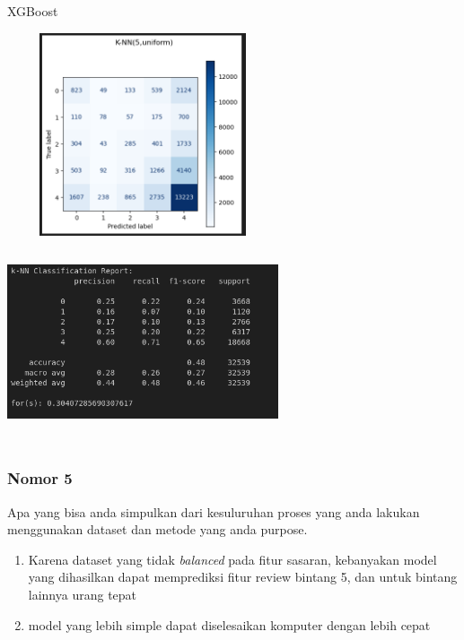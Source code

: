 \documentclass{article}
\begin{document}
 \begin{center}
    XGBoost
 \end{center}
 \begin{center}
    \includegraphics[width=8cm, height=6cm]{images/knn-confusion.png}
    \includegraphics[width=8cm, height=6cm]{images/knn-f1.png}
 \end{center}

\subsubsection*{Nomor 5}
Apa yang bisa anda simpulkan dari kesuluruhan proses yang anda lakukan menggunakan dataset dan metode yang anda purpose.
\begin{enumerate}
    \item Karena dataset yang tidak \emph{balanced} pada fitur sasaran, kebanyakan model yang dihasilkan dapat memprediksi fitur review bintang 5, dan untuk bintang lainnya urang tepat
    \item model yang lebih simple dapat diselesaikan komputer dengan lebih cepat
\end{enumerate}






\end{document}
